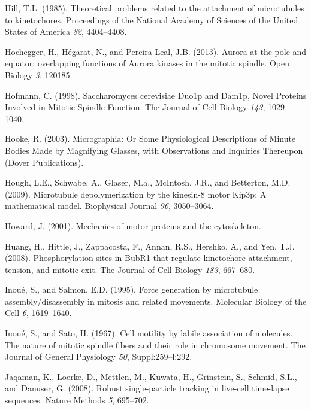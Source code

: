 \documentclass[12pt,a4paper,twoside,openright]{book}
\begin{document}
Hill, T.L. (1985). Theoretical problems related to the attachment of
microtubules to kinetochores. Proceedings of the National Academy of
Sciences of the United States of America \emph{82}, 4404--4408.

Hochegger, H., Hégarat, N., and Pereira-Leal, J.B. (2013). Aurora at the
pole and equator: overlapping functions of Aurora kinases in the mitotic
spindle. Open Biology \emph{3}, 120185.

Hofmann, C. (1998). Saccharomyces cerevisiae Duo1p and Dam1p, Novel
Proteins Involved in Mitotic Spindle Function. The Journal of Cell
Biology \emph{143}, 1029--1040.

Hooke, R. (2003). Micrographia: Or Some Physiological Descriptions of
Minute Bodies Made by Magnifying Glasses, with Observations and
Inquiries Thereupon (Dover Publications).

Hough, L.E., Schwabe, A., Glaser, M.a., McIntosh, J.R., and Betterton,
M.D. (2009). Microtubule depolymerization by the kinesin-8 motor Kip3p:
A mathematical model. Biophysical Journal \emph{96}, 3050--3064.

Howard, J. (2001). Mechanics of motor proteins and the cytoskeleton.

Huang, H., Hittle, J., Zappacosta, F., Annan, R.S., Hershko, A., and
Yen, T.J. (2008). Phosphorylation sites in BubR1 that regulate
kinetochore attachment, tension, and mitotic exit. The Journal of Cell
Biology \emph{183}, 667--680.

Inoué, S., and Salmon, E.D. (1995). Force generation by microtubule
assembly/disassembly in mitosis and related movements. Molecular Biology
of the Cell \emph{6}, 1619--1640.

Inoué, S., and Sato, H. (1967). Cell motility by labile association of
molecules. The nature of mitotic spindle fibers and their role in
chromosome movement. The Journal of General Physiology \emph{50},
Suppl:259--l:292.

Jaqaman, K., Loerke, D., Mettlen, M., Kuwata, H., Grinstein, S., Schmid,
S.L., and Danuser, G. (2008). Robust single-particle tracking in
live-cell time-lapse sequences. Nature Methods \emph{5}, 695--702.
\end{document}
